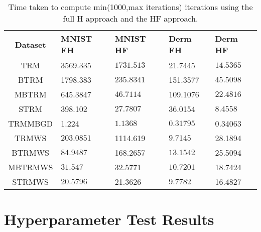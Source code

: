 \documentclass[letterpaper,12pt,titlepage,oneside,final]{book}
\begin{document}
\begin{table}[h] 
	\centering 
	\begin{tabular}{ |c|l|l|l|l| } 
		\hline 
		\textbf{Dataset} & \textbf{MNIST} FH & \textbf{MNIST} HF & \textbf{Derm} FH & \textbf{Derm} HF \\ 
		\hline 
		TRM &3569.335 & $\mathbf{1731.513}$ &21.7445 & $\mathbf{14.5365}$\\ 
		\hline 
		BTRM &1798.383 & $\mathbf{235.8341}$ &151.3577 & $\mathbf{45.5098}$\\ 
		\hline 
		MBTRM &645.3847 & $\mathbf{46.7114}$ &109.1076 & $\mathbf{22.4816}$\\ 
		\hline 
		STRM &398.102 & $\mathbf{27.7807}$ &36.0154 & $\mathbf{8.4558}$\\ 
		\hline 
		TRMMBGD &1.224 & $\mathbf{1.1368}$ & $\mathbf{0.31795}$ &0.34063\\ 
		\hline 
		TRMWS & $\mathbf{203.0851}$ &1114.619 & $\mathbf{9.7145}$ &28.1894\\ 
		\hline 
		BTRMWS & $\mathbf{84.9487}$ &168.2657 & $\mathbf{13.1542}$ &25.5094\\ 
		\hline 
		MBTRMWS & $\mathbf{31.547}$ &32.5771 & $\mathbf{10.7201}$ &18.7424\\ 
		\hline 
		STRMWS & $\mathbf{20.5796}$ &21.3626 & $\mathbf{9.7782}$ &16.4827\\ 
		\hline 
	\end{tabular} 
	\caption{Time taken to compute min(1000,max iterations) iterations using the full H approach and the HF approach.} 
\end{table}
	
	\chapter{Hyperparameter Test Results}
	\label{appendix:hyperparameter_values}
	
\end{document}
